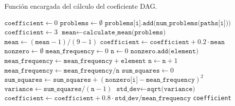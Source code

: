 \begin{algorithm}
\caption{Función encargada del cálculo del coeficiente DAG.}\label{alg:dag}
\begin{algorithmic}[1]
\State $\texttt{coefficient} \gets 0$
\State $\texttt{problems} \gets \emptyset$ 
\State $\texttt{problems[i].add(num\_problems(paths[i]))}$
\EndFor
{}
\State $\texttt{coefficient} \gets 3$
\Else
\State $\texttt{mean} \gets \texttt{calculate\_mean(problems)}$
\State $\texttt{mean} \gets (\texttt{mean} - 1) / (9-1)$ 
\State $\texttt{coefficient} \gets \texttt{coefficient} + 0.2 \cdot \texttt{mean}$
\State $\texttt{nonzero} \gets \emptyset$
\State $\texttt{mean\_frequency} \gets 0$
\State $\texttt{n} \gets 0$
\State $\texttt{nonzero.add(element)}$
\State $\texttt{mean\_frequency} \gets \texttt{mean\_frequency} + \texttt{element}$
\State $\texttt{n} \gets \texttt{n}+1$
\EndIf
\EndFor
\EndFor
\State $\texttt{mean\_frequency} \gets \texttt{mean\_frequency}/\texttt{n}$
\State $\texttt{sum\_squares} \gets 0$
\State $\texttt{sum\_squares} \gets \texttt{sum\_squares} + (\texttt{nonzero[i]}-\texttt{mean\_frequency})^2$
\EndFor
\State $\texttt{variance} \gets \texttt{sum\_squares}/(\texttt{n}-1)$
\State $\texttt{std\_dev} \gets \texttt{sqrt(variance)}$
\State $\texttt{coefficient} \gets \texttt{coefficient} + 0.8 \cdot \texttt{std\_dev}/\texttt{mean\_frequency}$
\EndIf
\State \Return \texttt{coefficient}
\EndFunction
\end{algorithmic}
\end{algorithm}